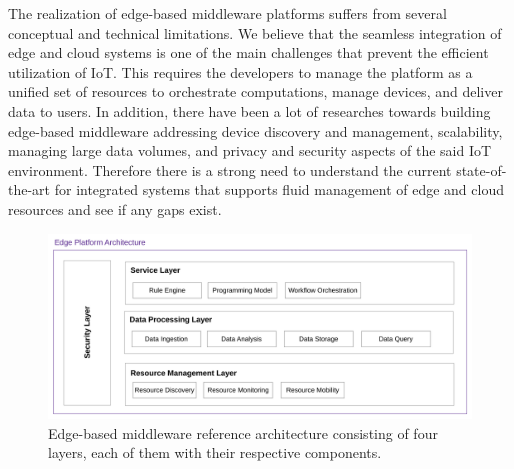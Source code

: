 The realization of edge-based middleware platforms suffers from several conceptual and technical limitations. We believe that the seamless integration of edge and cloud systems is one of the main challenges that prevent the efficient utilization of IoT. This requires the developers to manage the platform as a unified set of resources to orchestrate computations, manage devices, and deliver data to users. In addition, there have been a lot of researches towards building edge-based middleware addressing device discovery and management, scalability, managing large data volumes, and privacy and security aspects of the said IoT environment. Therefore there is a strong need to understand the current state-of-the-art for integrated systems that supports fluid management of edge and cloud resources and see if any gaps exist.



\begin{figure}[hbt!]
    \centering
    \includegraphics[scale=0.7]{Figures/IoTArchW.pdf}
    \caption{Edge-based middleware reference architecture consisting of four layers, each of them with their respective components.}
    \label{fig:EdgeArch}
\end{figure}

